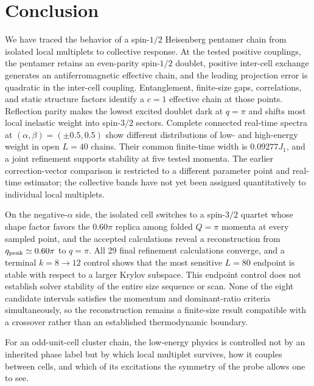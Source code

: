 \section{Conclusion}
\label{sec:conclusion}

We have traced the behavior of a spin-$1/2$ Heisenberg pentamer chain from
isolated local multiplets to collective response.
At the tested positive couplings, the pentamer retains an even-parity spin-$1/2$
doublet, positive inter-cell exchange generates an antiferromagnetic effective
chain, and the leading projection error is quadratic in the inter-cell coupling.
Entanglement, finite-size gaps, correlations, and static structure factors
identify a $c=1$ effective chain at those points.
Reflection parity makes the lowest excited doublet dark at $q=\pi$ and shifts most
local inelastic weight into spin-$3/2$ sectors.
Complete connected real-time spectra at $(\alpha,\beta)=(\pm0.5,0.5)$ show
different distributions of low- and high-energy weight in open $L=40$ chains.
Their common finite-time width is $0.09277J_1$, and a joint refinement supports
stability at five tested momenta.
The earlier correction-vector comparison is restricted to a different parameter
point and real-time estimator; the collective bands have not yet been assigned
quantitatively to individual local multiplets.

On the negative-$\alpha$ side, the isolated cell switches to a spin-$3/2$ quartet
whose shape factor favors the $0.60\pi$ replica among folded $Q=\pi$ momenta
at every sampled point, and the
accepted calculations reveal a reconstruction from $q_{\mathrm{peak}}\simeq0.60\pi$ to
$q=\pi$.
All 29 final refinement calculations converge, and a
terminal $k=8\rightarrow12$ control shows that the most sensitive $L=80$ endpoint
is stable with respect to a larger Krylov subspace.
This endpoint control does not establish solver stability of the entire size
sequence or scan.
None of the eight candidate intervals satisfies the momentum and dominant-ratio
criteria simultaneously, so the reconstruction remains a finite-size result
compatible with a crossover rather than an established thermodynamic boundary.

For an odd-unit-cell cluster chain, the low-energy physics is controlled not by an
inherited phase label but by which local multiplet survives, how it couples
between cells, and which of its excitations the symmetry of the probe allows one
to see.
